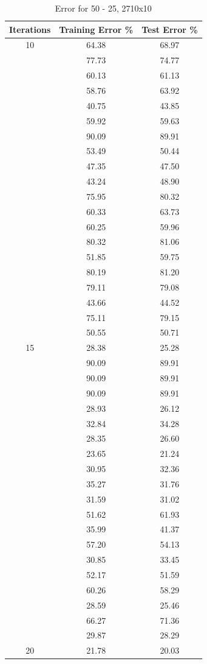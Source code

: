 \documentclass[12pt]{article}
\begin{document}
\begin{table}[h]
	\begin{center}
		\caption{Error for 50 - 25, 2710x10}
		\label{tab:table2}
		\begin{tabular}{|c|c|c|}
			\hline
			\textbf{Iterations} & \textbf{Training Error \%} & \textbf{Test Error \%} \\
			\hline
			10 & 64.38 & 68.97\\
			& 77.73 & 74.77\\
			& 60.13 & 61.13\\
			& 58.76 & 63.92\\
			& 40.75 & 43.85\\
			& 59.92 & 59.63\\
			& 90.09 & 89.91\\
			& 53.49 & 50.44\\
			& 47.35 & 47.50\\
			& 43.24 & 48.90\\
			& 75.95 & 80.32\\
			& 60.33 & 63.73\\
			& 60.25 & 59.96\\
			& 80.32 & 81.06\\
			& 51.85 & 59.75\\
			& 80.19 & 81.20\\
			& 79.11 & 79.08\\
			& 43.66 & 44.52\\
			& 75.11 & 79.15\\
			& 50.55 & 50.71\\
			\hline
			15 & 28.38 & 25.28\\
			& 90.09 & 89.91\\
			& 90.09 & 89.91\\
			& 90.09 & 89.91\\
			& 28.93 & 26.12\\
			& 32.84 & 34.28\\
			& 28.35 & 26.60\\
			& 23.65 & 21.24\\
			& 30.95 & 32.36\\
			& 35.27 & 31.76\\
			& 31.59 & 31.02\\
			& 51.62 & 61.93\\
			& 35.99 & 41.37\\
			& 57.20 & 54.13\\
			& 30.85 & 33.45\\
			& 52.17 & 51.59\\
			& 60.26 & 58.29\\
			& 28.59 & 25.46\\
			& 66.27 & 71.36\\
			& 29.87 & 28.29\\
			\hline
			20 & 21.78 & 20.03 \\
			\hline
		\end{tabular}
	\end{center}
\end{table}
\end{document}
